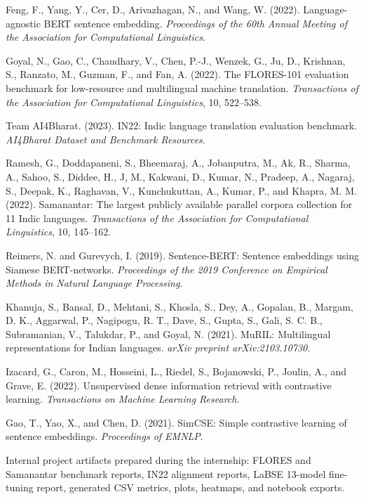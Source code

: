 \documentclass[12pt, a4paper]{article}
\begin{document}
\begin{enumerate}[label={[\arabic*]}, itemsep=4pt, leftmargin=1.5cm]

  \item Feng, F., Yang, Y., Cer, D., Arivazhagan, N., and Wang, W. (2022).
        Language-agnostic BERT sentence embedding.
        \textit{Proceedings of the 60th Annual Meeting of the Association for Computational Linguistics}.

  \item Goyal, N., Gao, C., Chaudhary, V., Chen, P.-J., Wenzek, G., Ju, D., Krishnan, S., Ranzato, M., Guzman, F., and Fan, A. (2022).
        The FLORES-101 evaluation benchmark for low-resource and multilingual machine translation.
        \textit{Transactions of the Association for Computational Linguistics}, 10, 522--538.

  \item Team AI4Bharat. (2023).
        IN22: Indic language translation evaluation benchmark.
        \textit{AI4Bharat Dataset and Benchmark Resources}.

  \item Ramesh, G., Doddapaneni, S., Bheemaraj, A., Jobanputra, M., Ak, R., Sharma, A., Sahoo, S., Diddee, H., J, M., Kakwani, D., Kumar, N., Pradeep, A., Nagaraj, S., Deepak, K., Raghavan, V., Kunchukuttan, A., Kumar, P., and Khapra, M. M. (2022).
        Samanantar: The largest publicly available parallel corpora collection for 11 Indic languages.
        \textit{Transactions of the Association for Computational Linguistics}, 10, 145--162.

  \item Reimers, N. and Gurevych, I. (2019).
        Sentence-BERT: Sentence embeddings using Siamese BERT-networks.
        \textit{Proceedings of the 2019 Conference on Empirical Methods in Natural Language Processing}.

  \item Khanuja, S., Bansal, D., Mehtani, S., Khosla, S., Dey, A., Gopalan, B., Margam, D. K., Aggarwal, P., Nagipogu, R. T., Dave, S., Gupta, S., Gali, S. C. B., Subramanian, V., Talukdar, P., and Goyal, N. (2021).
        MuRIL: Multilingual representations for Indian languages.
        \textit{arXiv preprint arXiv:2103.10730}.

  \item Izacard, G., Caron, M., Hosseini, L., Riedel, S., Bojanowski, P., Joulin, A., and Grave, E. (2022).
        Unsupervised dense information retrieval with contrastive learning.
        \textit{Transactions on Machine Learning Research}.

  \item Gao, T., Yao, X., and Chen, D. (2021).
        SimCSE: Simple contrastive learning of sentence embeddings.
        \textit{Proceedings of EMNLP}.

  \item Internal project artifacts prepared during the internship:
        FLORES and Samanantar benchmark reports, IN22 alignment reports, LaBSE 13-model fine-tuning report, generated CSV metrics, plots, heatmaps, and notebook exports.

\end{enumerate}
\end{document}
